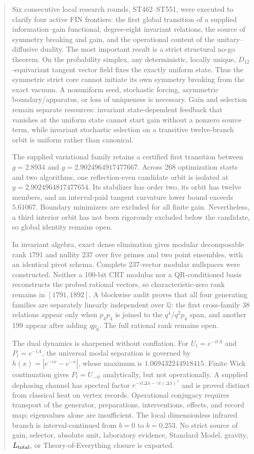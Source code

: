 \documentclass[11pt,a4paper]{article}
\theoremstyle{definition}\newtheorem{definition}[theorem]{Definition}
\theoremstyle{remark}\newtheorem{remark}[theorem]{Remark}
\begin{document}
\begin{abstract}
Six consecutive local research rounds, ST462--ST551, were executed to clarify four active FIN frontiers: the first global transition of a supplied information--gain functional, degree-eight invariant relations, the source of symmetry breaking and gain, and the operational content of the unitary--diffusive duality. The most important result is a strict structural no-go theorem. On the probability simplex, any deterministic, locally unique, $D_{12}$-equivariant tangent vector field fixes the exactly uniform state. Thus the symmetric strict core cannot initiate its own symmetry breaking from the exact vacuum. A nonuniform seed, stochastic forcing, asymmetric boundary/apparatus, or loss of uniqueness is necessary. Gain and selection remain separate resources: invariant state-dependent feedback that vanishes at the uniform state cannot start gain without a nonzero source term, while invariant stochastic selection on a transitive twelve-branch orbit is uniform rather than canonical.

The supplied variational family retains a certified first transition between $g=2.8934$ and $g=2.9024964917477667$. Across 268 optimization starts and two algorithms, one reflection-even candidate orbit is isolated at $g=2.9024964817477654$. Its stabilizer has order two, its orbit has twelve members, and an interval-paid tangent curvature lower bound exceeds $5.61067$. Boundary minimizers are excluded for all finite gain. Nevertheless, a third interior orbit has not been rigorously excluded below the candidate, so global identity remains open.

In invariant algebra, exact dense elimination gives modular decomposable rank $1791$ and nullity $237$ over five primes and two point ensembles, with an identical pivot schema. Complete 237-vector modular nullspaces were constructed. Neither a 100-bit CRT modulus nor a QR-conditioned basis reconstructs the probed rational vectors, so characteristic-zero rank remains in $[1791,1892]$. A blockwise audit proves that all four generating families are separately linearly independent over $\mathbb Q$: the first cross-family 38 relations appear only when $p_4p_4$ is joined to the $q^4/q^2p_4$ span, and another 199 appear after adding $qp_6$. The full rational rank remains open.

The dual dynamics is sharpened without conflation. For $U_t=e^{-itA}$ and $P_t=e^{-tA}$, the universal modal separation is governed by $h(x)=|e^{-ix}-e^{-x}|$, whose maximum is $1.069432244918415$. Finite Wick continuation gives $P_t=U_{-it}$ analytically, but not operationally. A supplied dephasing channel has spectral factor $e^{-it\Delta\lambda-\gamma t(\Delta\lambda)^2}$ and is proved distinct from classical heat on vertex records. Operational conjugacy requires transport of the generator, preparations, interventions, effects, and record map; eigenvalues alone are insufficient. The local dimensionless infrared branch is interval-continued from $b=0$ to $b=0.253$. No strict source of gain, selector, absolute unit, laboratory evidence, Standard Model, gravity, $L_{\rm total}$, or Theory-of-Everything closure is exported.
\end{abstract}
\end{document}
